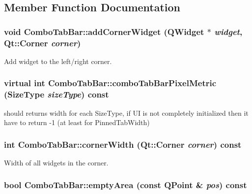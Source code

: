 \subsection{Member Function Documentation}
\hypertarget{class_combo_tab_bar_a3371dbfa9365711b28f7440dbd4d36e6}{
\subsubsection[{addCornerWidget}]{\setlength{\rightskip}{0pt plus 5cm}void ComboTabBar::addCornerWidget ({\bf QWidget} $\ast$ {\em widget}, \/  Qt::Corner {\em corner})}}
\label{class_combo_tab_bar_a3371dbfa9365711b28f7440dbd4d36e6}


Add widget to the left/right corner. 

\hypertarget{class_combo_tab_bar_abfe5f8784d0433283bca4c087f0d2b42}{
\subsubsection[{comboTabBarPixelMetric}]{\setlength{\rightskip}{0pt plus 5cm}virtual int ComboTabBar::comboTabBarPixelMetric ({\bf SizeType} {\em sizeType}) const}}
\label{class_combo_tab_bar_abfe5f8784d0433283bca4c087f0d2b42}


should returns width for each SizeType, if UI is not completely initialized then it have to return -\/1 (at least for PinnedTabWidth) 

\hypertarget{class_combo_tab_bar_add04fdbda2e634592d3ba6c0a3083e46}{
\subsubsection[{cornerWidth}]{\setlength{\rightskip}{0pt plus 5cm}int ComboTabBar::cornerWidth (Qt::Corner {\em corner}) const}}
\label{class_combo_tab_bar_add04fdbda2e634592d3ba6c0a3083e46}


Width of all widgets in the corner. 

\hypertarget{class_combo_tab_bar_a737d267e4cd82efad188b2d5ce601810}{
\subsubsection[{emptyArea}]{\setlength{\rightskip}{0pt plus 5cm}bool ComboTabBar::emptyArea (const QPoint \& {\em pos}) const}}
\label{class_combo_tab_bar_a737d267e4cd82efad188b2d5ce601810}


